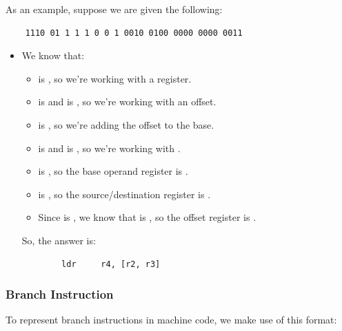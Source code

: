 \documentclass[letterpaper]{article}
\begin{document}
As an example, suppose we are given the following:
\begin{verbatim}
    1110 01 1 1 1 0 0 1 0010 0100 0000 0000 0011
\end{verbatim}
\begin{itemize}
    \item We know that:
    \begin{itemize}
        \item {} is , so we're working with a register. 
        \item {} is  and  is , so we're working with an offset.
        \item {} is , so we're adding the offset to the base. 
        \item {} is  and  is , so we're working with . 
        \item {} is , so the base operand register is . 
        \item {} is , so the source/destination register is . 
        \item Since  is , we know that  is , so the offset register is . 
    \end{itemize}
    So, the answer is:
    \begin{verbatim}
        ldr     r4, [r2, r3]
    \end{verbatim}
\end{itemize}

\subsubsection{Branch Instruction}
To represent branch instructions in machine code, we make use of this format: 

\begin{center}
\end{center}
\end{document}
